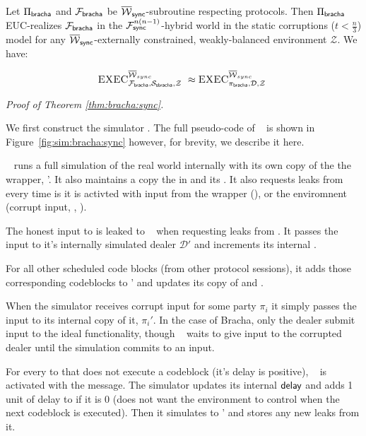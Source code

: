 \begin{theorem}\label{thm:bracha:sync}
Let $\Pi_{{\mathsf {bracha}}}$ and $\mathcal{F}_{{\mathsf {bracha}}}$ be $\overline{\mathcal{W}}_{{\mathsf {sync}}}$-subroutine respecting protocols. 
Then $\Pi_{{\mathsf {bracha}}}$ EUC-realizes $\mathcal{F}_{{\mathsf {bracha}}}$ in the $\mathcal{F}^{n(n-1)}_{{\mathsf {sync}}}$-hybrid world in the static corruptions ($t < \frac{n}{3}$) model for any $\overline{\mathcal{W}}_{{\mathsf {sync}}}$-externally constrained, weakly-balanced environment $\mathcal{Z}$. We have:

$$\textsc{EXEC}^{\overline{\mathcal{W}}_{sync}}_{\mathcal{F}_{{\mathsf {bracha}}}, \mathcal{S}_{{\mathsf {sbracha}}}, \mathcal{Z}~} \approx \textsc{EXEC}^{\overline{\mathcal{W}}_{sync}}_{\pi_{{\mathsf {bracha}}}, \mathcal{D}, \mathcal{Z}~}$$
\end{theorem}

\textit{Proof of Theorem \ref{thm:bracha:sync}.}

We first construct the simulator \Ssyncbracha. 
The full pseudo-code of \Ssyncbracha~ is shown in Figure~\ref{fig:sim:bracha:sync} however, for brevity, we describe it here.

\Ssyncbracha~ runs a full simulation of the real world internally with its own copy of the the wrapper, \Wsync'. It also maintains a copy the  in \Wsync and its . 
It also requests leaks from \Wsync every time is it is activted with input from the wrapper (\Advance), or the enviromnent (corrupt input, \Delay, \Exec).

The honest input to \Fbracha is leaked to \Ssyncbracha~ when requesting leaks from \Wsync. 
It passes the input to it's internally simulated dealer $\mathcal{D}'$ and increments its internal .

For all other scheduled code blocks (from other protocol sessions), it adds those corresponding codeblocks to \Wsync' and updates its copy of  and .

 When the simulator receives corrupt input for some party $\pi_i$ it simply passes the input to its internal copy of it, $\pi_i'$. In the case of Bracha, only the dealer submit input to the ideal functionality, though \Ssyncbracha~ waits to give input to the corrupted dealer until the simulation commits to an input.

For every  to \Wsync that does not execute a codeblock (it's delay is positive), \Ssyncbracha~ is activated with the  message.
The simulator updates its internal ${\mathsf {delay}}$ and adds 1 unit of delay to \Wsync if it is 0 (does not want the environment to control when the next codeblock is executed).
Then it simulates  to \Wsync' and stores any new leaks from it.

